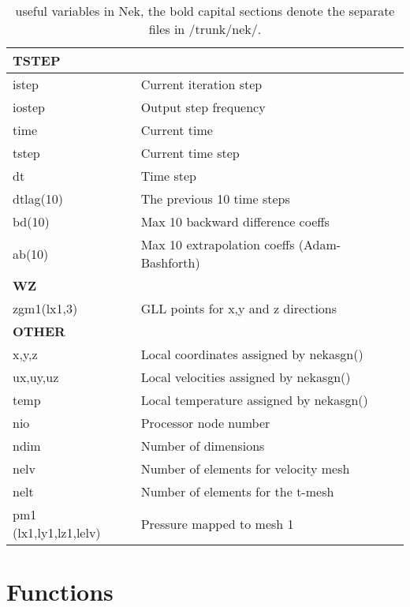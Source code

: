 \begin{table}
\begin{tabular}{l l}
\multicolumn{2}{l}{\textbf{TSTEP}}\\ \hline
istep                            & Current iteration step\\
iostep                           & Output step frequency\\
time                             & Current time\\
tstep                            & Current time step	\\
dt                               & Time step\\
dtlag(10)                        & The previous 10 time steps\\
bd(10)                           & Max 10 backward difference coeffs\\
ab(10)                           & Max 10 extrapolation coeffs (Adam-Bashforth)\\

\multicolumn{2}{l}{\textbf{WZ}}\\ \hline
zgm1(lx1,3)                      & GLL points for x,y and z directions \\

\multicolumn{2}{l}{\textbf{OTHER}}\\ \hline            
x,y,z                            & Local coordinates assigned by nekasgn()\\
ux,uy,uz                         & Local velocities assigned by nekasgn()\\
temp                             & Local temperature assigned by nekasgn()\\
nio                              & Processor node number  \\
ndim                             & Number of dimensions\\
nelv                             & Number of elements for velocity mesh\\
nelt                             & Number of elements for the t-mesh\\
pm1 (lx1,ly1,lz1,lelv)           & Pressure mapped to mesh 1\\

\end{tabular}

\caption{useful variables in Nek, the bold capital sections denote the separate files in /trunk/nek/.}

\label{tab:variables}
\end{table}

\section{Functions}

